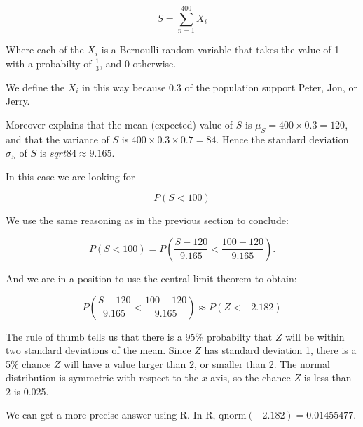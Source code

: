 \documentclass[a5paper,11pt]{article}
\begin{document}
\begin{equation}
S = \sum_{n=1}^{400} X_i 
\end{equation}

Where each of the $X_i$ is a Bernoulli
random variable that takes the value of
1 with a probabilty of $\frac{1}{3}$,
and 0 otherwise.

We define the $X_i$ in this way because
$0.3$ of the population support Peter,
Jon, or Jerry. 

Moreover \cite{reading5a} explains that
the mean (expected) value of $S$ is 
$\mu_S = 400 \times 0.3 = 120$, and that
the variance of $S$ is
$400 \times 0.3 \times 0.7 = 84$.
Hence the standard deviation $\sigma_S$ of 
$S$ is $sqrt{84} \approx 9.165$.


In this case we are looking for

\begin{equation}
P\left(S < 100\right)
\end{equation}

We use the same reasoning as in the
previous section to conclude:

\begin{equation}
P\left(S < 100\right) =
P\left(\frac{S-120}{9.165} < 
\frac{100-120}{9.165} \right).
\end{equation}

And we are in a position to use the central
limit theorem to obtain:

\begin{equation}
P\left(\frac{S-120}{9.165} < 
\frac{100-120}{9.165} \right) \approx
P\left(Z < -2.182 \right)
\end{equation}

The rule of thumb \cite{reading6b} tells us
that there is a 95\% probabilty that $Z$
will be within two standard deviations of
the mean. Since $Z$ has standard deviation
1, there is a 5\% chance $Z$ will have a
value larger than $2$, or smaller than 2.
The normal distribution is symmetric
with respect to the $x$ axis, so the chance
$Z$ is less than $2$ is 0.025.

We can get a more precise answer using R.
In R, qnorm$\left( -2.182 \right) = 
0.01455477$.
\printbibliography{}
\end{document}
